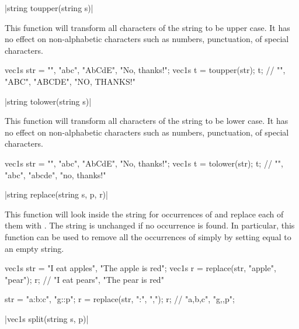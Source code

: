 \item \vectorfunc \cppinline|string toupper(string s)| 

This function will transform all characters of the string to be upper case. It has no effect on non-alphabetic characters such as numbers, punctuation, of special characters.

\begin{example}
\begin{cppcode}
vec1s str = {"", "abc", "AbCdE", "No, thanks!"};
vec1s t = toupper(str);
t; // {"", "ABC", "ABCDE", "NO, THANKS!"}
\end{cppcode}
\end{example}

\item \vectorfunc \cppinline|string tolower(string s)| 

This function will transform all characters of the string to be lower case. It has no effect on non-alphabetic characters such as numbers, punctuation, of special characters.

\begin{example}
\begin{cppcode}
vec1s str = {"", "abc", "AbCdE", "No, thanks!"};
vec1s t = tolower(str);
t; // {"", "abc", "abcde", "no, thanks!"}
\end{cppcode}
\end{example}

\item \vectorfunc \cppinline|string replace(string s, p, r)| 

This function will look inside the string  for occurrences of  and replace each of them with . The string is unchanged if no occurrence is found. In particular, this function can be used to remove all the occurrences of  simply by setting  equal to an empty string.

\begin{example}
\begin{cppcode}
vec1s str = {"I eat apples", "The apple is red"};
vec1s r = replace(str, "apple", "pear");
r; // {"I eat pears", "The pear is red"}

str = {"a:b:c", "g::p"};
r = replace(str, ":", ",");
r; // {"a,b,c", "g,,p"};
\end{cppcode}
\end{example}

\item \cppinline|vec1s split(string s, p)| 

